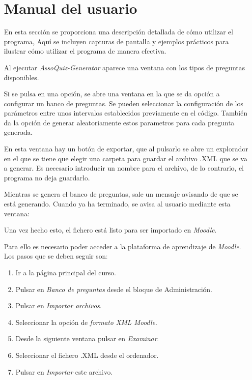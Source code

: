 
\section{Manual del usuario}

En esta sección se proporciona una descripción detallada de cómo utilizar el programa, Aquí se incluyen capturas de pantalla y ejemplos prácticos para ilustrar cómo utilizar el programa de manera efectiva. 

Al ejecutar \textit{AssoQuiz-Generator} aparece una ventana con los tipos de preguntas disponibles.

Si se pulsa en una opción, se abre una ventana en la que se da opción a configurar un banco de preguntas. Se pueden seleccionar la configuración de los parámetros entre unos intervalos establecidos previamente en el código. También da la opción de generar aleatoriamente estos parametros para cada pregunta generada.


En esta ventana hay un botón de exportar, que al pulsarlo se abre un explorador en el que se tiene que elegir una carpeta para guardar el archivo .XML que se va a generar. Es necesario introducir un nombre para el archivo, de lo contrario, el programa no deja guardarlo.


Mientras se genera el banco de preguntas, sale un mensaje avisando de que se está generando. Cuando ya ha terminado, se avisa al usuario mediante esta ventana:


Una vez hecho esto, el fichero está listo para ser importado en \textit{Moodle}. 

Para ello es necesario poder acceder a la plataforma de aprendizaje de \textit{Moodle}. Los pasos que se deben seguir son:

\begin{enumerate}
    \item Ir a la página principal del curso.
    \item Pulsar en \textit{Banco de preguntas} desde el bloque de Administración.
    \item Pulsar en \textit{Importar archivos}.
    \item Seleccionar la opción de \textit{formato XML Moodle}.
    \item Desde la siguiente ventana pulsar en \textit{Examinar}.
    \item Seleccionar el fichero .XML desde el ordenador.
    \item Pulsar en \textit{Importar} este archivo.
\end{enumerate}

